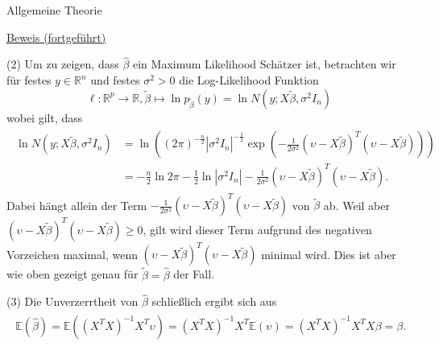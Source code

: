 \documentclass[
  8pt,
  ignorenonframetext,
]{beamer}
\begin{document}
\begin{frame}{Allgemeine Theorie}
\protect\hypertarget{allgemeine-theorie-3}{}
\footnotesize

\underline{Beweis (fortgeführt)}

\noindent (2) Um zu zeigen, dass \(\hat{\beta}\) ein Maximum Likelihood
Schätzer ist, betrachten wir für festes \(y \in \mathbb{R}^n\) und
festes \(\sigma^2 > 0\) die Log-Likelihood Funktion \begin{equation}
\ell : \mathbb{R}^p \to \mathbb{R}, \tilde{\beta} \mapsto \ln p_{\tilde{\beta}}(y) = \ln N(y;X\tilde{\beta}, \sigma^2I_n)
\end{equation} wobei gilt, dass \begin{align}
\begin{split}
\ln N(y;X\tilde{\beta}, \sigma^2I_n)
& = \ln\left((2\pi)^{-\frac{n}{2}}|\sigma^2I_n|^{-\frac{1}{2}}\exp\left(-\frac{1}{2\sigma^2}(\upsilon -  X\tilde{\beta})^T(\upsilon -  X\tilde{\beta})\right)\right) \\
& = -\frac{n}{2} \ln 2\pi - \frac{1}{2} \ln |\sigma^2I_n| - \frac{1}{2\sigma^2}(\upsilon -  X\tilde{\beta})^T(\upsilon -  X\tilde{\beta}).
\end{split}
\end{align} Dabei hängt allein der Term
\(-\frac{1}{2\sigma^2}(\upsilon - X\tilde{\beta})^T(\upsilon - X\tilde{\beta})\)
von \(\tilde{\beta}\) ab. Weil aber
\((\upsilon - X\tilde{\beta})^T(\upsilon - X\tilde{\beta}) \ge 0\), gilt
wird dieser Term aufgrund des negativen Vorzeichen maximal, wenn
\((\upsilon - X\tilde{\beta})^T(\upsilon - X\tilde{\beta})\) minimal
wird. Dies ist aber wie oben gezeigt genau für
\(\tilde{\beta} = \hat{\beta}\) der Fall.

\vspace{2mm}

\noindent (3) Die Unverzerrtheit von \(\hat{\beta}\) schließlich ergibt
sich aus \begin{align}
\begin{split}
\mathbb{E}(\hat{\beta})
= \mathbb{E}\left((X^TX)^{-1}X^T\upsilon\right)
= (X^TX)^{-1}X^T\mathbb{E}(\upsilon)
= (X^TX)^{-1}X^TX\beta
= \beta.
\end{split}
\end{align}
\end{frame}
\end{document}
